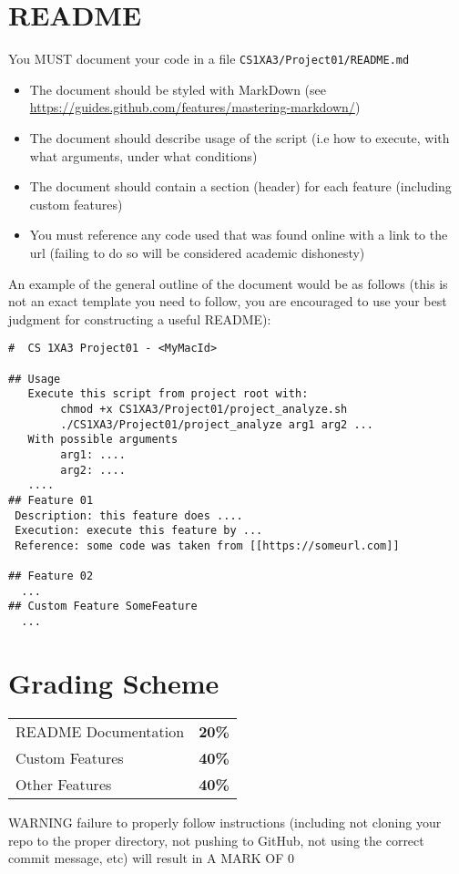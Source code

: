 \documentclass[11pt]{article}
\begin{document}
\newpage

\section{README}
\label{sec:org0e67195}
You {\color{purple}MUST} document your code in a file \texttt{CS1XA3/Project01/README.md}
\begin{itemize}
\item The document should be styled with {\color{purple}MarkDown} (see
{\color{cyan}\url{https://guides.github.com/features/mastering-markdown/}})
\item The document should describe usage of the script (i.e how to execute, with what arguments, under what conditions)
\item The document should contain a section (header) for each feature (including custom features)
\item You must reference any code used that was found online with a link to the
url (failing to do so will be considered academic dishonesty)
\end{itemize}
An example of the general outline of the document would be as follows (this is
not an exact template you need to follow, you are encouraged to use your best
judgment for constructing a useful README):


\begin{verbatim}
#  CS 1XA3 Project01 - <MyMacId>

## Usage
   Execute this script from project root with:
        chmod +x CS1XA3/Project01/project_analyze.sh
        ./CS1XA3/Project01/project_analyze arg1 arg2 ...
   With possible arguments
        arg1: ....
        arg2: ....
   ....
## Feature 01
 Description: this feature does ....
 Execution: execute this feature by ...
 Reference: some code was taken from [[https://someurl.com]]

## Feature 02
  ...
## Custom Feature SomeFeature
  ...
\end{verbatim}

\newpage

\section{Grading Scheme}
\label{sec:org0b7a4b5}
\begin{center}
\begin{tabular}{ll}
README Documentation & \textbf{20\%}\\
Custom Features & \textbf{40\%}\\
Other Features & \textbf{40\%}\\
\end{tabular}
\end{center}
{\color{red}WARNING} failure to properly follow instructions (including not cloning
 your repo to the proper directory, not pushing to GitHub, not using the
 correct commit message, etc) will result in {\color{purple}A MARK OF 0}
\end{document}
